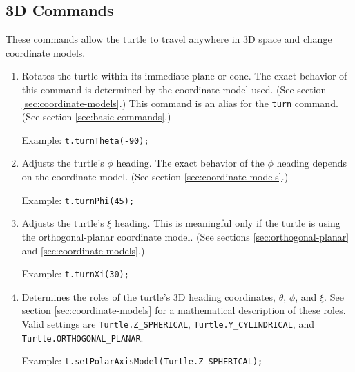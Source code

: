 \documentclass{article}
\newenvironment{commandtable}
  {\begin{enumerate}}
  {\end{enumerate}}
\def\command[#1]{\item[\tt #1]}
\def\example[#1]{\par Example: {\tt #1}}
\begin{document}
    \subsection{3D Commands}
      \label{sec:3d-commands}

      These commands allow the turtle to travel anywhere in 3D space and change
      coordinate models.

      \begin{commandtable}
	\command[turnTheta]
	Rotates the turtle within its immediate plane or cone. The exact
	behavior of this command is determined by the coordinate model used.
	(See section \ref{sec:coordinate-models}.) This command is an alias for
	the {\tt turn} command. (See section \ref{sec:basic-commands}.)
	\example[t.turnTheta(-90);]

	\command[turnPhi]
	Adjusts the turtle's $\phi$ heading. The exact behavior of the $\phi$
	heading depends on the coordinate model. (See section
	\ref{sec:coordinate-models}.)
	\example[t.turnPhi(45);]

	\command[turnXi]
	Adjusts the turtle's $\xi$ heading. This is meaningful only if the
	turtle is using the orthogonal-planar coordinate model. (See sections
	\ref{sec:orthogonal-planar} and \ref{sec:coordinate-models}.)
	\example[t.turnXi(30);]

	\command[setPolarAxisModel]
	Determines the roles of the turtle's 3D heading coordinates, $\theta$,
	$\phi$, and $\xi$. See section \ref{sec:coordinate-models} for a
	mathematical description of these roles. Valid settings are
	\verb|Turtle.Z_SPHERICAL|, \verb|Turtle.Y_CYLINDRICAL|, and
	\verb|Turtle.ORTHOGONAL_PLANAR|.
	\example[t.setPolarAxisModel(Turtle.Z\_SPHERICAL);]
      \end{commandtable}
\end{document}
